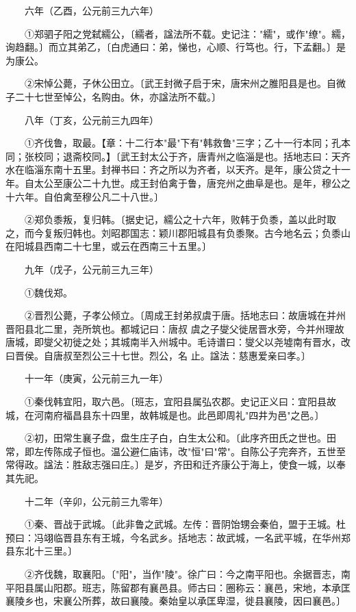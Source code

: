 　　六年（乙酉，公元前三九六年）

　　①郑驷子阳之党弑繻公，〔繻者，諡法所不载。史记注："繻"，或作"缭"。繻，询趋翻。〕而立其弟乙，〔白虎通曰：弟，悌也，心顺、行笃也。行，下孟翻。〕是为康公。

　　②宋悼公薨，子休公田立。〔武王封微子启于宋，唐宋州之脽阳县是也。自微子二十七世至悼公，名购由。休，亦諡法所不载。〕

　　八年（丁亥，公元前三九四年）

　　①齐伐鲁，取最。【章：十二行本"最"下有"韩救鲁"三字；乙十一行本同；孔本同；张校同；退斋校同。】〔武王封太公于齐，唐青州之临淄是也。括地志曰：天齐水在临淄东南十五里。封禅书曰：齐之所以为齐者，以天齐。是年，康公贷之十一年。自太公至康公二十九世。成王封伯禽于鲁，唐兖州之曲阜是也。是年，穆公之十六年。自伯禽至穆公凡二十八世。〕

　　②郑负黍叛，复归韩。〔据史记，繻公之十六年，败韩于负黍，盖以此时取之，而今复叛归韩也。刘昭郡国志：颖川郡阳城县有负黍聚。古今地名云；负黍山在阳城县西南二十七里，或云在西南三十五里。〕

　　九年（戊子，公元前三九三年）

　　①魏伐郑。

　　②晋烈公薨，子孝公倾立。〔周成王封弟叔虞于唐。括地志曰：故唐城在并州晋阳县北二里，尧所筑也。都城记曰：唐叔 虞之子燮父徙居晋水旁，今并州理故唐城，即燮父初徙之处；其城南半入州城中。毛诗谱曰：燮父以尧墟南有晋水，改曰晋侯。自唐叔至烈公三十七世。烈公，名 止。諡法：慈惠爱亲曰孝。〕

　　十一年（庚寅，公元前三九一年）

　　①秦伐韩宜阳，取六邑。〔班志，宜阳县属弘农郡。史记正义曰：宜阳县故城，在河南府福昌县东十四里，故韩城是也。此邑即周礼"四井为邑"之邑。〕

　　②初，田常生襄子盘，盘生庄子白，白生太公和。〔此序齐田氏之世也。田常，即左传陈成子恒也。温公避仁庙讳，改"恒"曰"常"。自陈公子完奔齐，五世至常得政。諡法：胜敌志强曰庄。〕是岁，齐田和迁齐康公于海上，使食一城，以奉其先祀。

　　十二年（辛卯，公元前三九零年）

　　①秦、晋战于武城。〔此非鲁之武城。左传：晋阴饴甥会秦伯，盟于王城。杜预曰：冯翊临晋县东有王城，今名武乡。括地志：故武城，一名武平城，在华州郑县东北十三里。〕

　　②齐伐魏，取襄阳。〔"阳"，当作"陵"。徐广曰：今之南平阳也。余据晋志，南平阳县属山阳郡。班志，陈留郡有襄邑县。师古曰：圈称云：襄邑，宋地，本承匡襄陵乡也，宋襄公所葬，故曰襄陵。秦始皇以承匡卑湿，徙县襄陵，因曰襄邑。〕

